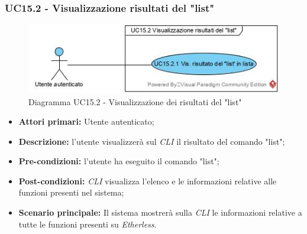 \subsubsection{UC15.2 - Visualizzazione risultati del "list"}
\begin{figure}[!h]
	\centering
	\includegraphics[width=0.7\linewidth]{res/img/UC15.2.jpg}
	\caption{Diagramma UC15.2 - Visualizzazione dei risultati del "list"}
\end{figure}
\begin{itemize}
	\item \textbf{Attori primari:} Utente autenticato;
	\item \textbf{Descrizione:} l'utente visualizzerà sul \textit{CLI\glo} il risultato del comando "list";
	\item \textbf{Pre-condizioni:} l'utente ha eseguito il comando "list";
	\item \textbf{Post-condizioni:} \textit{CLI\glo} visualizza l'elenco e le informazioni relative alle funzioni presenti nel sistema;
	\item \textbf{Scenario principale:} Il sistema mostrerà sulla \textit{CLI\glo} le informazioni relative a tutte le funzioni presenti su \textit{Etherless\glos}.
\end{itemize}
